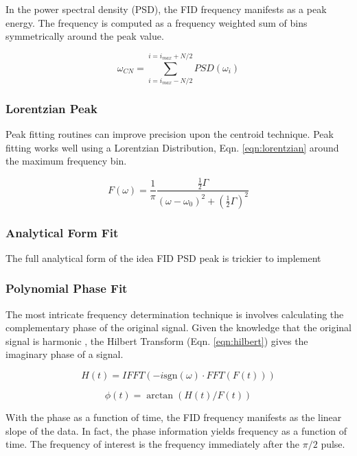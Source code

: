 In the power spectral density (PSD), the FID frequency manifests as a peak energy.  The frequency is computed as a frequency weighted  sum of bins symmetrically around the peak value.

\begin{equation}
\omega_{CN} = \sum_{i=i_{max} - N/2}^{i=i_{max} + N/2} PSD(\omega_i)
\label{eqn:freq-cn}
\end{equation}


\subsubsection{Lorentzian Peak}
Peak fitting routines can improve precision upon the centroid technique.  Peak fitting works well using a Lorentzian Distribution, Eqn. \ref{eqn:lorentzian} around the maximum frequency bin.

\begin{equation}
F(\omega) = \frac{1}{\pi}\frac{\frac{1}{2} \Gamma}{(\omega - \omega_0)^2 + (\frac{1}{2} \Gamma)^2}
\label{eqn:lorentzian}
\end{equation}

\subsubsection{Analytical Form Fit}
The full analytical form of the idea FID PSD peak is trickier to implement


\subsubsection{Polynomial Phase Fit}
The most intricate frequency determination technique is involves calculating the complementary phase of the original signal.  Given the knowledge that the original signal is harmonic , the Hilbert Transform (Eqn. \ref{eqn:hilbert}) gives the imaginary phase of a signal.

\begin{equation}
H(t) = IFFT(-i \mathrm{sgn}(\omega) \cdot FFT(F(t)))
\label{eqn:hilbert}
\end{equation}

\begin{equation}
\phi(t) = \arctan(H(t) / F(t))
\label{eqn:phase}
\end{equation}

With the phase as a function of time, the FID frequency manifests as the linear slope of the data.  In fact, the phase information yields frequency as a function of time.  The frequency of interest is the frequency immediately after the $\pi/2$ pulse.

